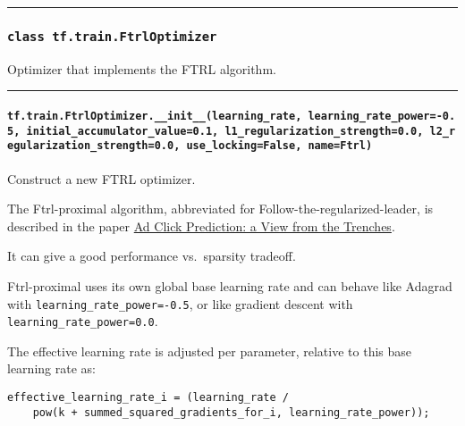 \begin{center}\rule{0.5\linewidth}{\linethickness}\end{center}

\subsubsection{\texorpdfstring{\texttt{class\ tf.train.FtrlOptimizer}
}{class tf.train.FtrlOptimizer }}\label{class-tf.train.ftrloptimizer}

Optimizer that implements the FTRL algorithm.

\begin{center}\rule{0.5\linewidth}{\linethickness}\end{center}

\paragraph{\texorpdfstring{\texttt{tf.train.FtrlOptimizer.\_\_init\_\_(learning\_rate,\ learning\_rate\_power=-0.5,\ initial\_accumulator\_value=0.1,\ l1\_regularization\_strength=0.0,\ l2\_regularization\_strength=0.0,\ use\_locking=False,\ name=\textquotesingle{}Ftrl\textquotesingle{})}
}{tf.train.FtrlOptimizer.\_\_init\_\_(learning\_rate, learning\_rate\_power=-0.5, initial\_accumulator\_value=0.1, l1\_regularization\_strength=0.0, l2\_regularization\_strength=0.0, use\_locking=False, name='Ftrl') }}\label{tf.train.ftrloptimizer.ux5fux5finitux5fux5flearningux5frate-learningux5frateux5fpower-0.5-initialux5faccumulatorux5fvalue0.1-l1ux5fregularizationux5fstrength0.0-l2ux5fregularizationux5fstrength0.0-useux5flockingfalse-nameftrl}

Construct a new FTRL optimizer.

The Ftrl-proximal algorithm, abbreviated for
Follow-the-regularized-leader, is described in the paper
\href{https://www.eecs.tufts.edu/~dsculley/papers/ad-click-prediction.pdf}{Ad
Click Prediction: a View from the Trenches}.

It can give a good performance vs.~sparsity tradeoff.

Ftrl-proximal uses its own global base learning rate and can behave like
Adagrad with \texttt{learning\_rate\_power=-0.5}, or like gradient
descent with \texttt{learning\_rate\_power=0.0}.

The effective learning rate is adjusted per parameter, relative to this
base learning rate as:

\begin{verbatim}
effective_learning_rate_i = (learning_rate /
    pow(k + summed_squared_gradients_for_i, learning_rate_power));
\end{verbatim}

